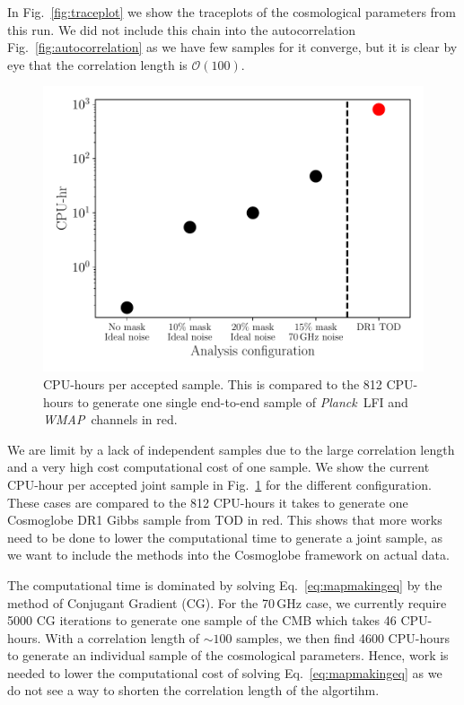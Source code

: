 \documentclass[twocolumn]{../common/aa}
\def\wmap{\emph{WMAP}}
\def\planck{\emph{Planck}}
\begin{document}
In Fig.~\ref{fig:traceplot} we show the traceplots of the cosmological parameters from this run. We did not include this chain into the autocorrelation Fig.~\ref{fig:autocorrelation} as we have few samples for it converge, but it is clear by eye that the correlation length is $\mathcal{O}(100)$.

\begin{figure}
	\centering
	\includegraphics[width=\linewidth]{figures/run_time.pdf}
	\caption{\label{fig:runtime}CPU-hours per accepted sample. This is compared to the 812 CPU-hours to generate one single end-to-end sample of \planck\ LFI and \wmap\ channels in red.}
\end{figure}

We are limit by a lack of independent samples due to the large correlation length and a very high cost computational cost of one sample. We show the current CPU-hour per accepted joint sample in Fig.~\ref{fig:runtime} for the different configuration. These cases are compared to the 812 CPU-hours it takes to generate one Cosmoglobe DR1 Gibbs sample from TOD in red. This shows that more works need to be done to lower the computational time to generate a joint sample, as we want to include the methods into the Cosmoglobe framework on actual data.

The computational time is dominated by solving Eq.~\eqref{eq:mapmakingeq} by the method of Conjugant Gradient (CG). For the 70\,GHz case, we currently require 5000 CG iterations to generate one sample of the CMB which takes 46 CPU-hours. With a correlation length of $\sim 100$ samples, we then find 4600 CPU-hours to generate an individual sample of the cosmological parameters. Hence, work is needed to lower the computational cost of solving Eq.~\eqref{eq:mapmakingeq} as we do not see a way to shorten the correlation length of the algortihm.
\end{document}
